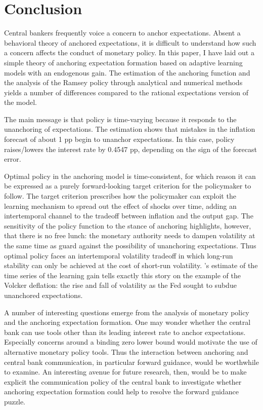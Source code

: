 \documentclass[11pt]{article}
\renewcommand{\[}{\begin{equation}}
\renewcommand{\]}{\end{equation}}
\def\ppFEunanchors{1 }
\def\ppMoveFFR{0.4547 }
\begin{document}
\section{Conclusion}\label{conclusion}
Central bankers frequently voice a concern to anchor expectations. Absent a behavioral theory of anchored expectations, it is difficult to understand how such a concern affects the conduct of monetary policy. In this paper, I have laid out a simple theory of anchoring expectation formation based on adaptive learning models with an endogenous gain. The estimation of the anchoring function and the analysis of the Ramsey policy through analytical and numerical methods yields a number of differences compared to the rational expectations version of the model. 

The main message is that policy is time-varying because it responds to the unanchoring of expectations. The estimation shows that mistakes in the inflation forecast of about \ppFEunanchors pp begin to unanchor expectations. In this case, policy raises/lowers the interest rate by \ppMoveFFR pp, depending on the sign of the forecast error.

Optimal policy in the anchoring model is time-consistent, for which reason it can be expressed as a purely forward-looking target criterion for the policymaker to follow. The target criterion prescribes how the policymaker can exploit the learning mechanism to spread out the effect of shocks over time, adding an intertemporal channel to the tradeoff between inflation and the output gap. The sensitivity of the policy function to the stance of anchoring highlights, however, that there is no free lunch: the monetary authority needs to dampen volatility at the same time as guard against the possibility of unanchoring expectations. Thus optimal policy faces an intertemporal volatility tradeoff in which long-run stability can only be achieved at the cost of short-run volatility. \cite{carvalho2019anchored}'s estimate of the time series of the learning gain tells exactly this story on the example of the Volcker deflation: the rise and fall of volatility as the Fed sought to subdue unanchored expectations. 

A number of interesting questions emerge from the analysis of monetary policy and the anchoring expectation formation. One may wonder whether the central bank can use tools other than its leading interest rate to anchor expectations. Especially concerns around a binding zero lower bound would motivate the use of alternative monetary policy tools. Thus the interaction between anchoring and central bank communication, in particular forward guidance, would be worthwhile to examine. An interesting avenue for future research, then, would be to make explicit the communication policy of the central bank to investigate whether anchoring expectation formation could help to resolve the forward guidance puzzle. 
\end{document}
